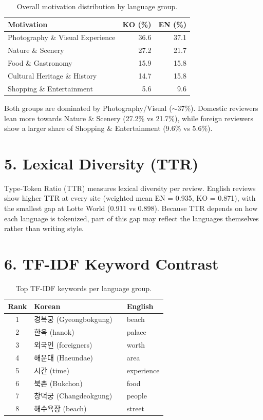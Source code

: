 \documentclass[11pt,a4paper]{article}
\begin{document}
\begin{table}[H]
\centering
\small
\begin{tabular}{lRR}
\toprule
\textbf{Motivation} & \textbf{KO (\%)} & \textbf{EN (\%)} \\
\midrule
Photography \& Visual Experience & 36.6 & 37.1 \\
Nature \& Scenery                & 27.2 & 21.7 \\
Food \& Gastronomy               & 15.9 & 15.8 \\
Cultural Heritage \& History     & 14.7 & 15.8 \\
Shopping \& Entertainment        &  5.6 &  9.6 \\
\bottomrule
\end{tabular}
\caption{Overall motivation distribution by language group.}
\end{table}

Both groups are dominated by Photography/Visual ($\sim$37\%). Domestic
reviewers lean more towards Nature \& Scenery (27.2\% vs 21.7\%), while
foreign reviewers show a larger share of Shopping \& Entertainment
(9.6\% vs 5.6\%).

\section*{5. Lexical Diversity (TTR)}

Type-Token Ratio (TTR) measures lexical diversity per review. English reviews
show higher TTR at every site (weighted mean EN = 0.935, KO = 0.871), with the
smallest gap at Lotte World (0.911 vs 0.898). Because TTR depends on how each
language is tokenized, part of this gap may reflect the languages themselves
rather than writing style.

\section*{6. TF-IDF Keyword Contrast}

\begin{table}[H]
\centering
\small
\begin{tabular}{clcl}
\toprule
\textbf{Rank} & \textbf{Korean} & & \textbf{English} \\
\midrule
1 & 경복궁 (Gyeongbokgung) & & beach \\
2 & 한옥 (hanok)           & & palace \\
3 & 외국인 (foreigners)    & & worth \\
4 & 해운대 (Haeundae)      & & area \\
5 & 시간 (time)            & & experience \\
6 & 북촌 (Bukchon)         & & food \\
7 & 창덕궁 (Changdeokgung) & & people \\
8 & 해수욕장 (beach)       & & street \\
\bottomrule
\end{tabular}
\caption{Top TF-IDF keywords per language group.}
\end{table}
\end{document}
